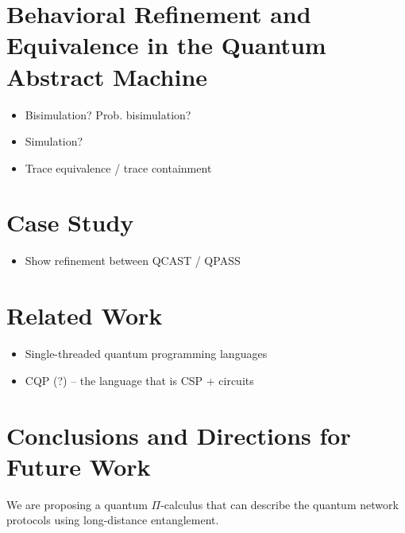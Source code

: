 \documentclass[a4paper,UKenglish,cleveref, autoref, thm-restate]{lipics-v2021}
\begin{document}




\section{Behavioral Refinement and Equivalence in the Quantum Abstract Machine} \label{sec:refinement}

\begin{itemize}
    \item Bisimulation?  Prob. bisimulation?
    \item Simulation?
    \item Trace equivalence / trace containment
\end{itemize}

\section{Case Study} \label{sec:case-study}

\begin{itemize}
    \item Show refinement between QCAST / QPASS
\end{itemize}

\section{Related Work} \label{sec:related-work}

\begin{itemize}
    \item Single-threaded quantum programming languages
    \item CQP (?) -- the language that is CSP + circuits
\end{itemize}

\section{Conclusions and Directions for Future Work} \label{sec:conclusions}

We are proposing a quantum $\Pi$-calculus that can describe the quantum network protocols using long-distance entanglement. 
\end{document}

